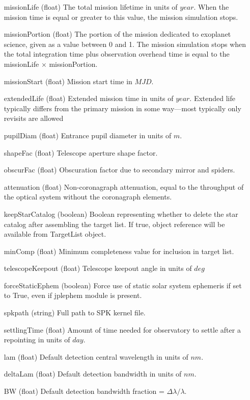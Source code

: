 \documentclass[cleanfoot]{asme2ej}
\begin{document}
\begin{itemize}[leftmargin=1.5in,font={\ttfamily}]
\item[missionLife] (float) The total mission lifetime in units of $ year $.  When the mission time is equal or greater to this value, the mission simulation stops.
\item[missionPortion] (float) The portion of the mission dedicated to exoplanet science, given as a value between 0 and 1. The mission simulation stops when the total integration time plus observation overhead time is equal to the missionLife $\times$ missionPortion.
\item[missionStart] (float) Mission start time in $ MJD $. 
\item[extendedLife] (float) Extended mission time in units of $ year $.  Extended life typically differs from the primary mission in some way---most typically only revisits are allowed
\item[pupilDiam] (float) Entrance pupil diameter in units of $m$.
\item[shapeFac] (float)  Telescope aperture shape factor.
\item[obscurFac] (float) Obscuration factor due to secondary mirror and spiders.
\item[attenuation] (float) Non-coronagraph attenuation, equal to the throughput of the optical system without the coronagraph elements.
\item[keepStarCatalog] (boolean) Boolean representing whether to delete the star catalog after assembling the target list.  If true, object reference will be available from TargetList object.
\item[minComp] (float) Minimum completeness value for inclusion in target list. 
\item[telescopeKeepout] (float) Telescope keepout angle in units of $ deg $
\item[forceStaticEphem]  (boolean) Force use of static solar system ephemeris if set to True, even if jplephem module is present.
\item[spkpath] (string) Full path to SPK kernel file.
\item[settlingTime] (float) Amount of time needed for observatory to settle after a repointing in units of $ day $.           
\item[lam] (float) Default detection central wavelength in units of $ nm $.
\item[deltaLam] (float) Default detection bandwidth in units of $ nm $.
\item[BW] (float) Default detection bandwidth fraction = $\Delta\lambda/\lambda$.

\end{itemize}
\end{document}
